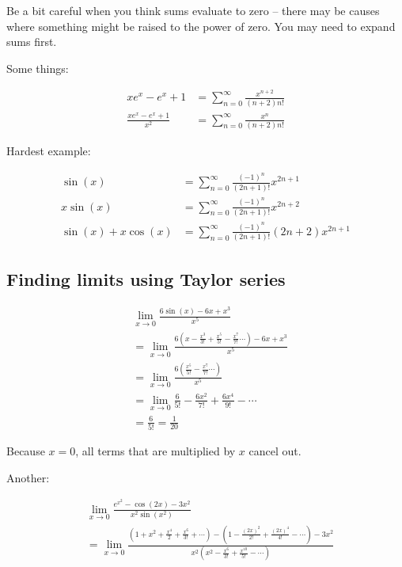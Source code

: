 \documentclass[12pt]{article}
\theoremstyle{plain}
\theoremstyle{remark}
\theoremstyle{definition}
\begin{document}
Be a bit careful when you think sums evaluate to zero -- there may be
causes where something might be raised to the power of zero. You may
need to expand sums first.

Some things:

\begin{align*}
xe^{x} - e^{x} + 1 &= \sum_{n = 0}^{\infty}\frac{x^{n + 2}}{(n + 2)n!} \\
\frac{xe^{x} - e^{x} + 1}{x^{2}} &= \sum_{n = 0}^{\infty}\frac{x^{n}}{(n + 2)n!}
\end{align*}


Hardest example:

\begin{align*}
\sin(x) &= \sum_{n = 0}^{\infty}{\frac{( - 1)^{n}}{(2n + 1)!}x^{2n + 1}} \\
x\sin(x) &= \sum_{n = 0}^{\infty}{\frac{( - 1)^{n}}{(2n + 1)!}x^{2n + 2}} \\
\sin(x) + x\cos(x) &= \sum_{n = 0}^{\infty}{\frac{( - 1)^{n}}{(2n + 1)!}(2n + 2)x^{2n + 1}}
\end{align*}



\subsection{Finding limits using Taylor
series}

\begin{align*}
&\lim_{x \rightarrow 0}\frac{6\sin(x) - 6x + x^{3}}{x^{5}} \\
&= \lim_{x \rightarrow 0}\frac{6\left( x - \frac{x^{3}}{3!} + \frac{x^{5}}{5!} - \frac{x^{7}}{7!}\cdots \right) - 6x + x^{3}}{x^{5}} \\
&= \lim_{x \rightarrow 0}\frac{6\left( \frac{x^{5}}{5!} - \frac{x^{7}}{7!}\cdots \right)}{x^{5}} \\
&= \lim_{x \rightarrow 0}{\frac{6}{5!} - \frac{6x^{2}}{7!} + \frac{6x^{4}}{9!} - \cdots} \\
&= \frac{6}{5!} = \frac{1}{20}
\end{align*}


Because \(x = 0\), all terms that are multiplied by \(x\) cancel out.

Another:

\begin{align*}
&\lim_{x \rightarrow 0}\frac{e^{x^{2}} - \cos(2x) - 3x^{2}}{x^{2}\sin\left( x^{2} \right)} \\
&= \lim_{x \rightarrow 0}\frac{\left( 1 + x^{2} + \frac{x^{4}}{2} + \frac{x^{6}}{3!} + \cdots \right) - \left( 1 - \frac{(2x)^{2}}{2!} + \frac{(2x)^{4}}{4!} - \cdots \right) - 3x^{2}}{x^{2}\left( x^{2} - \frac{x^{6}}{3!} + \frac{x^{10}}{5!} - \cdots \right)}
\end{align*}
\end{document}
